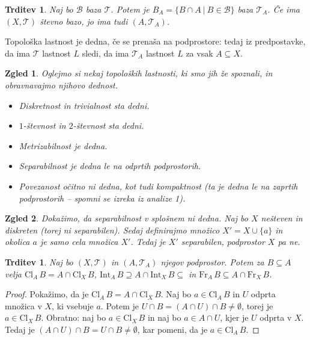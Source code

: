 \documentclass[10pt, a4paper]{article}
\newtheorem{trditev}[izr]{Trditev}
\newtheorem{zgled}{Zgled}[section]
\newenvironment{noticeC}{%
  \tcolorbox[%
  notitle,
  empty,
  enhanced,  %
  breakable,
  coltext=black, 
  fontupper=\rmfamily,
  parbox=false,
  noparskip,
  sharp corners,
  boxrule=-1pt,  %
  frame hidden,
  left=7pt,  %
  right=7pt,
  top=5pt,
  bottom=5pt,
  before skip=2.5ex plus 2pt,
  after skip=2.5ex plus 2pt,
  overlay unbroken and last={%
  },
  ]}
{\endtcolorbox}
\newenvironment{dokaz}%
  {\begin{noticeC}\begin{proof}}%
  {\end{proof}\end{noticeC}}
\newcommand{\topo}[1]{\mathcal{#1}}
\newcommand{\cl}{\mathrm{Cl}}
\newcommand{\inte}{\mathrm{Int}}
\newcommand{\fr}{\mathrm{Fr}}
\begin{document}
\begin{trditev}
  Naj bo $\mathcal{B}$ baza $\topo{T}$. Potem je $B_A = \{B \cap A\ |\ B \in \topo{B}\}$ baza $\topo{T}_A$.
  Če ima $(X, \topo{T})$ števno bazo, jo ima tudi $(A, \topo{T}_A)$.
\end{trditev}

Topološka lastnost je dedna, če se prenaša na podprostore: tedaj iz predpostavke, da ima $\topo{T}$ lastnost $L$ sledi,
da ima $\topo{T}_A$ lastnost $L$ za vsak $A \subseteq X$.

\begin{zgled}
  Oglejmo si nekaj topoloških lastnosti, ki smo jih že spoznali, in obravnavajmo njihovo dednost.
  \begin{itemize}
    \item Diskretnost in trivialnost sta dedni.
    \item $1$-števnost in $2$-števnost sta dedni.
    \item Metrizabilnost je dedna.
    \item Separabilnost je dedna le na odprtih podprostorih.
    \item Povezanost očitno ni dedna, kot tudi kompaktnost (ta je dedna le na zaprtih podprostorih -- spomni se izreka iz analize 1).
  \end{itemize}
\end{zgled}

\begin{zgled}
  Dokažimo, da separabilnost v splošnem ni dedna.
  Naj bo $X$ nešteven in diskreten (torej ni separabilen).
  Sedaj definirajmo množico $X' = X \cup \{a\}$ in okolica $a$ je samo cela množica $X'$.
  Tedaj je $X'$ separabilen, podprostor $X$ pa ne.
\end{zgled}

\begin{trditev}
  Naj bo $(X, \mathcal{T})$ in $(A, \mathcal{T}_A)$ njegov podprostor.
  Potem za $B \subseteq A$ velja $\cl_A\, {B} = A \cap \cl_X \, B$, $\inte_A\, B\supseteq A \cap \inte_X \, B \subseteq$ 
  in $\fr_A \, B \subseteq A \cap \fr_X \, B$.
\end{trditev}

\begin{dokaz}
  Pokažimo, da je $\cl_A \, B = A \cap \cl_X \, B$.
  Naj bo $a \in \cl_A \, B$ in $U$ odprta množica v $X$, ki vsebuje $a$.
  Potem je $U \cap B = (A \cap U) \cap B \neq \emptyset$, torej je $a \in \cl_X\, B$.
  Obratno: naj bo $a \in \cl_X \, B$ in naj bo $a \in A \cap U$, kjer je $U$ odprta v $X$.
  Tedaj je $(A \cap U) \cap B = U \cap B \neq \emptyset$, kar pomeni, da je $a \in \cl_A\, B$.
\end{dokaz}
\end{document}
